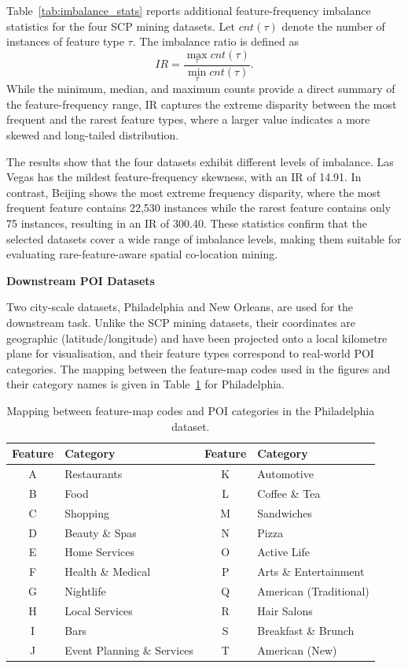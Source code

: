 \documentclass[12pt, letterpaper]{template}
\theoremstyle{definition}
\begin{document}
Table~\ref{tab:imbalance_stats} reports additional feature-frequency imbalance
statistics for the four SCP mining datasets. Let $cnt(\tau)$ denote the number
of instances of feature type $\tau$. The imbalance ratio is defined as
\[
IR = \frac{\max_{\tau} cnt(\tau)}{\min_{\tau} cnt(\tau)}.
\]
While the minimum, median, and maximum counts provide a direct summary of the
feature-frequency range, IR captures the extreme disparity between the most
frequent and the rarest feature types, where a larger value indicates a more
skewed and long-tailed distribution.

The results show that the four datasets exhibit different levels of imbalance.
Las Vegas has the mildest feature-frequency skewness, with an IR of 14.91. In
contrast, Beijing shows the most extreme frequency disparity, where the most
frequent feature contains 22{,}530 instances while the rarest feature contains
only 75 instances, resulting in an IR of 300.40. These statistics confirm that
the selected datasets cover a wide range of imbalance levels, making them
suitable for evaluating rare-feature-aware spatial co-location mining.

\vspace{6pt}
\noindent\textbf{Downstream POI Datasets}
\vspace{2pt}

Two city-scale datasets, Philadelphia and New Orleans, are used for the
downstream task. Unlike the SCP mining datasets, their coordinates are geographic
(latitude/longitude) and have been projected onto a local kilometre plane for
visualisation, and their feature types correspond to real-world POI categories.
The mapping between the feature-map codes used in the figures and their category
names is given in Table~\ref{tab:philly_feature_map} for Philadelphia.

\begin{table}[H]
\centering
\caption{Mapping between feature-map codes and POI categories in the
Philadelphia dataset.}
\label{tab:philly_feature_map}
\begin{tabular}{cl|cl}
\toprule
\textbf{Feature} & \textbf{Category} & \textbf{Feature} & \textbf{Category} \\
\midrule
A & Restaurants        & K & Automotive \\
B & Food               & L & Coffee \& Tea \\
C & Shopping           & M & Sandwiches \\
D & Beauty \& Spas     & N & Pizza \\
E & Home Services      & O & Active Life \\
F & Health \& Medical  & P & Arts \& Entertainment \\
G & Nightlife          & Q & American (Traditional) \\
H & Local Services     & R & Hair Salons \\
I & Bars               & S & Breakfast \& Brunch \\
J & Event Planning \& Services & T & American (New) \\
\bottomrule
\end{tabular}
\end{table}
\end{document}
